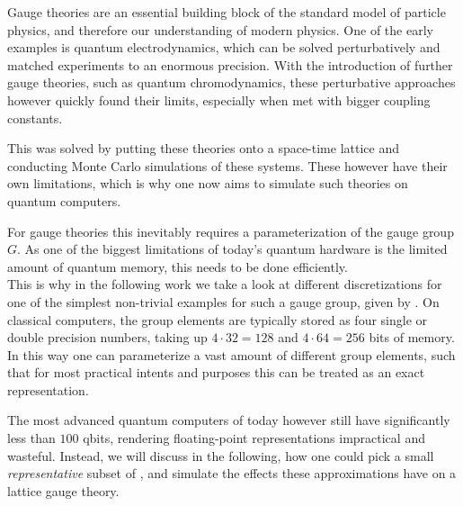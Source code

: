 
Gauge theories are an essential building block of the standard model of particle physics, and therefore our understanding of modern physics. One of the early examples is quantum electrodynamics, which can be solved perturbatively and matched experiments to an enormous precision. With the introduction of further gauge theories, such as quantum chromodynamics, these perturbative approaches however quickly found their limits, especially when met with bigger coupling constants.

This was solved by putting these theories onto a space-time lattice and conducting Monte Carlo simulations of these systems. These however have their own limitations, which is why one now aims to simulate such theories on quantum computers.

For gauge theories this inevitably requires a parameterization of the gauge group $G$. As one of the biggest limitations of today's quantum hardware is the limited amount of quantum memory, this needs to be done efficiently.\\

This is why in the following work we take a look at different discretizations for one of the simplest non-trivial examples for such a gauge group, given by \SUTwo. On classical computers, the group elements are typically stored as four single or double precision numbers, taking up $4 \cdot 32 = 128$ and $4 \cdot 64 = 256$ bits of memory. In this way one can parameterize a vast amount of different group elements, such that for most practical intents and purposes this can be treated as an exact representation.

The most advanced quantum computers of today however still have significantly less than $100$ qbits, rendering floating-point representations impractical and wasteful. Instead, we will discuss in the following, how one could pick a small \emph{representative} subset of \SUTwo, and simulate the effects these approximations have on a lattice gauge theory.
